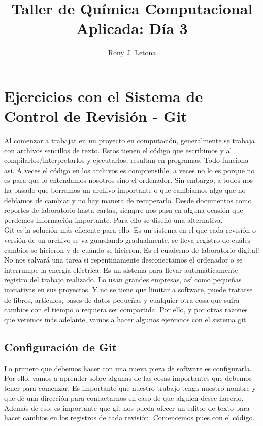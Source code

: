 \documentclass[10pt,letterpaper]{article}
\author{Rony J. Letona}
\title{Taller de Qu\'imica Computacional Aplicada: D\'ia 3}
\begin{document}
\maketitle

\section{Ejercicios con el Sistema de Control de Revisi\'on - Git}
Al comenzar a trabajar en un proyecto en computaci\'on, generalmente se trabaja con archivos sencillos de texto. Estos tienen el c\'odigo que escribimos y al compilarlos/interpretarlos y ejecutarlos, resultan en programas. Todo funciona as\'i. A veces el c\'odigo en los archivos es comprensible, a veces no lo es porque no es para que lo entendamos nosotros sino el ordenador. Sin embargo, a todos nos ha pasado que borramos un archivo importante o que cambiamos algo que no deb\'iamos de cambiar y no hay manera de recuperarlo. Desde documentos como reportes de laboratorio hasta cartas, siempre nos pasa en alguna ocasi\'on que perdemos informaci\'on importante. Para ello se dise\~n\'o una alternativa.\\

Git es la soluci\'on m\'as eficiente para ello. Es un sistema en el que cada revisi\'on o versi\'on de un archivo se va guardando gradualmente, se lleva registro de cu\'ales cambios se hicieron y de cu\'ando se hicieron. Es el cuaderno de laboratorio digital! No nos salvar\'a una tarea si repentinamente desconectamos el ordenador o se interrumpe la energ\'ia el\'ectrica. Es un sistema para llevar autom\'aticamente registro del trabajo realizado. Lo usan grandes empresas, as\'i como peque\~nas iniciativas en sus proyectos. Y no se tiene que limitar a software, puede tratarse de libros, art\'iculos, bases de datos peque\~nas y cualquier otra cosa que sufra cambios con el tiempo o requiera ser compartida. Por ello, y por otras razones que veremos m\'as adelante, vamos a hacer algunos ejercicios con el sistema git.

\subsection{Configuraci\'on de Git}
Lo primero que debemos hacer con una nueva pieza de software es configurarla. Por ello, vamos a aprender sobre algunas de las cosas importantes que debemos tener para comenzar. Es importante que nuestro trabajo tenga nuestro nombre y que d\'e una direcci\'on para contactarnos en caso de que alguien desee hacerlo. Adem\'as de eso, es importante que git nos pueda ofecer un editor de texto para hacer cambios en los registros de cada revisi\'on. Comencemos pues con el c\'odigo.\\
\end{document}
